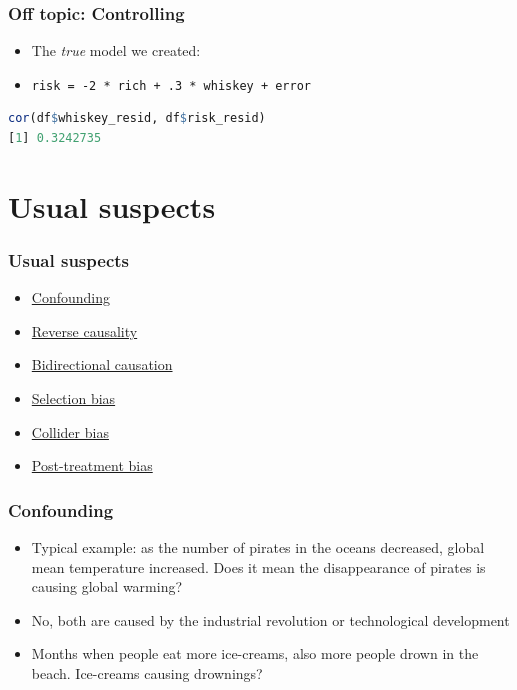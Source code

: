 \documentclass[aspectratio=43]{beamer}
\begin{document}
\begin{frame}[fragile]
\frametitle{Off topic: Controlling}
\centering

\begin{itemize}
  \item The \textit{true} model we created:
  \item[] \texttt{risk = -2 * rich + .3 * whiskey + error}
\end{itemize}

\begin{lstlisting}[language=R]
cor(df$whiskey_resid, df$risk_resid)
[1] 0.3242735
\end{lstlisting}

\end{frame}

\section{Usual suspects}

\begin{frame}
\frametitle{Usual suspects}
\centering

\begin{itemize}
  \item \hyperlink{confounding}{Confounding}
  \item \hyperlink{reverse}{Reverse causality}
  \item \hyperlink{bidirect}{Bidirectional causation}
  \item \hyperlink{selectbias}{Selection bias}
  \item \hyperlink{collider}{Collider bias}
  \item \hyperlink{ptbias}{Post-treatment bias}
\end{itemize}


\end{frame}


\begin{frame}
\frametitle{Confounding}\label{confounding}
\centering

\begin{itemize}[<+->]
  \item Typical example: as the number of pirates in the oceans decreased, global mean temperature increased. Does it mean the disappearance of pirates is causing global warming?
  \item No, both are caused by the industrial revolution or technological development
  \item Months when people eat more ice-creams, also more people drown in the beach. Ice-creams causing drownings?
\end{itemize}

\end{frame}
\end{document}
